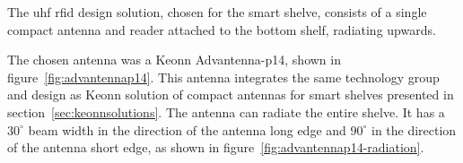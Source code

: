 The \ac{uhf} \ac{rfid} design solution, chosen for the smart shelve, consists of a single compact antenna and reader attached to the bottom shelf, radiating upwards.%


The chosen antenna was a Keonn Advantenna-p14, shown in figure~\ref{fig:advantennap14}. This antenna integrates the same technology group and design as Keonn solution of compact antennas for smart shelves presented in section~\ref{sec:keonnsolutions}.
The antenna can radiate the entire shelve. It has a $30^{\circ}$ beam width in the direction of the antenna long edge and $90^{\circ}$ in the direction of the antenna short edge, as shown in figure~\ref{fig:advantennap14-radiation}.

